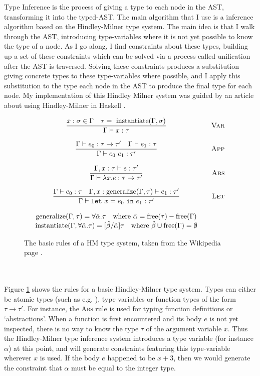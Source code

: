 Type Inference is the process of giving a type to each node in the AST, transforming it into the typed-AST. The main algorithm that I use is a inference algorithm based on the Hindley-Milner type system. The main idea is that I walk through the AST, introducing type-variables where it is not yet possible to know the type of a node. As I go along, I find constraints about these types, building up a set of these constraints which can be solved via a process called unification after the AST is traversed. Solving these constraints produces a substitution giving concrete types to these type-variables where possible, and I apply this substitution to the type each node in the AST to produce the final type for each node. My implementation of this Hindley Milner system was guided by an article about using Hindley-Milner in Haskell \cite{Hmi}.
\begin{figure}[h]
    $$\begin{array}{clr}
    \dfrac{x : \sigma \in \Gamma \quad \tau =\ \text{instantiate}(\Gamma, \sigma)}{\Gamma \vdash x : \tau} && \textsc{Var} \\\\
    \dfrac{\Gamma \vdash e_0 : \tau \rightarrow \tau' \quad \Gamma \vdash e_1 : \tau}{\Gamma \vdash e_0\ e_1 : \tau'} && \textsc{App} \\\\
    \dfrac{\Gamma, x : \tau \vdash e : \tau'}{\Gamma \vdash \lambda x . e : \tau \rightarrow \tau'} && \textsc{Abs} \\\\
    \dfrac{\Gamma \vdash e_0 : \tau \quad \Gamma, x : \text{generalize}(\Gamma, \tau) \vdash e_1 : \tau'}{\Gamma \vdash \mathtt{let}\ x = e_0\ \mathtt{in}\ e_1 : \tau'} && \textsc{Let} \\\\
    \text{generalize}(\Gamma, \tau) = \forall \hat{\alpha} . \tau \quad \text{where}\ \hat{\alpha} = \text{free}(\tau) - \text{free}(\Gamma) && \\
    \text{instantiate}(\Gamma, \forall \hat{\alpha} . \tau) = [\hat{\beta} / \hat{\alpha}]\tau \quad \text{where}\ \hat{\beta} \cup \text{free}(\Gamma) = \emptyset
    
\end{array}$$
\caption{The basic rules of a HM type system, taken from the Wikipedia page \cite{Hmts}.}
\label{fig:hm}
\end{figure}
\\\\
Figure \ref{fig:hm} shows the rules for a basic Hindley-Milner type system. Types can either be atomic types (such as e.g. ), type variables or function types of the form $\tau \rightarrow \tau'$. For instance, the \textsc{Abs} rule is used for typing function definitions or `abstractions'. When a function is first encountered and its body $e$ is not yet inspected, there is no way to know the type $\tau$ of the argument variable $x$. Thus the Hindley-Milner type inference system introduces a type variable (for instance $\alpha$) at this point, and will generate constraints featuring this type-variable wherever $x$ is used. If the body $e$ happened to be $x + 3$, then we would generate the constraint that $\alpha$ must be equal to the integer type.
